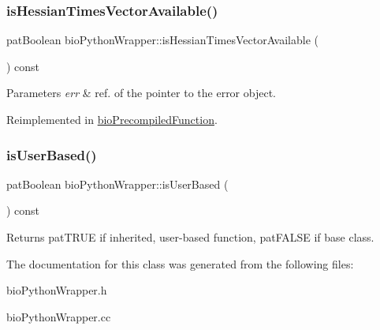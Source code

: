 \subsubsection{\texorpdfstring{is\+Hessian\+Times\+Vector\+Available()}{isHessianTimesVectorAvailable()}}
{\footnotesize\ttfamily pat\+Boolean bio\+Python\+Wrapper\+::is\+Hessian\+Times\+Vector\+Available (\begin{DoxyParamCaption}{ }\end{DoxyParamCaption}) const\hspace{0.3cm}{\ttfamily [virtual]}}


\begin{DoxyParams}{Parameters}
{\em err} & ref. of the pointer to the error object. \\
\hline
\end{DoxyParams}


Reimplemented in \hyperlink{classbio_precompiled_function_ad29704661602c786841335f8d27795d1}{bio\+Precompiled\+Function}.

\mbox{\label{classbio_python_wrapper_a8952bd430a948cdc4f42f631ca3ddbd9}} 
\subsubsection{\texorpdfstring{is\+User\+Based()}{isUserBased()}}
{\footnotesize\ttfamily pat\+Boolean bio\+Python\+Wrapper\+::is\+User\+Based (\begin{DoxyParamCaption}{ }\end{DoxyParamCaption}) const}

\begin{DoxyReturn}{Returns}
pat\+T\+R\+UE if inherited, user-\/based function, pat\+F\+A\+L\+SE if base class. 
\end{DoxyReturn}


The documentation for this class was generated from the following files\+:\begin{DoxyCompactItemize}
\item 
bio\+Python\+Wrapper.\+h\item 
bio\+Python\+Wrapper.\+cc\end{DoxyCompactItemize}
